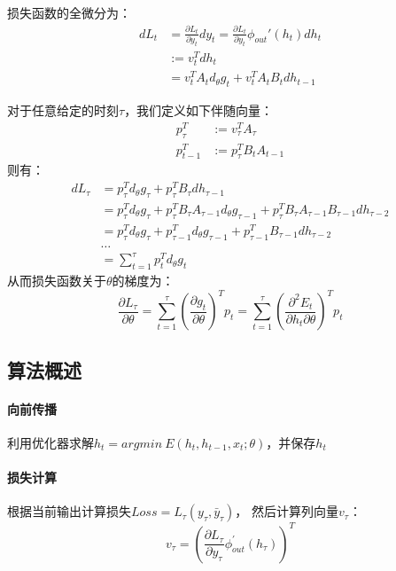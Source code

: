 \documentclass[UTF8]{ctexart}   %
\newcommand{\ptl}[2]{\frac{\partial #1}{\partial #2}}
\begin{document}
        损失函数的全微分为：
        \begin{align}
            dL_t &= \ptl{L_t}{y_t} dy_t = \ptl{L_t}{y_t} \phi_{out}'(h_t) dh_t \\
            &:= v_t^T dh_t \\
            &= v_t^T A_t d_\theta g_t + v_t^T A_t B_t dh_{t-1}
        \end{align}

        对于任意给定的时刻$\tau$，我们定义如下伴随向量：
        \begin{align}
            p_\tau^T &:= v_\tau^T A_\tau \\
            p_{t-1}^T &:=p_\tau^T B_t A_{t-1}
        \end{align}
        则有：
        \begin{equation}
            \begin{aligned}
                dL_\tau &= p_\tau^T d_\theta g_\tau + p_\tau^T B_\tau dh_{\tau-1} \\
                &= p_\tau^T d_\theta g_\tau + p_\tau^T B_\tau A_{\tau-1} d_\theta g_{\tau-1} + p_\tau^T B_\tau A_{\tau-1} B_{\tau-1} dh_{\tau-2} \\
                &= p_\tau^T d_\theta g_\tau + p_{\tau-1}^T d_\theta g_{\tau-1} + p_{\tau-1}^T B_{\tau-1} dh_{\tau-2} \\
                &\dots \\
                &= \sum_{t=1}^{\tau} p_t^T d_\theta g_{t}
            \end{aligned}
        \end{equation}
        从而损失函数关于$\theta$的梯度为：
        \begin{equation}
            \label{eq:1}
            \frac{\partial L_\tau}{\partial \theta} = \sum_{t=1}^{\tau} \left( \frac{\partial g_t}{\partial \theta} \right)^T p_t = \sum_{t=1}^{\tau} \left(\ptl{^2 E_t}{h_t \partial \theta}\right)^T p_t
        \end{equation}

    \subsection{算法概述}
        \paragraph{向前传播}
        利用优化器求解$h_t = argmin~E(h_t, h_{t-1}, x_t; \theta)$，并保存$h_t$
        \paragraph{损失计算}
        根据当前输出计算损失$Loss = L_\tau(y_\tau, \bar{y}_\tau)$， 然后计算列向量$v_\tau$：
        \begin{equation}
            v_\tau = \left( \frac{\partial L_\tau}{\partial y_\tau} \phi_{out}^{\prime}(h_\tau) \right)^T
        \end{equation}
\end{document}
